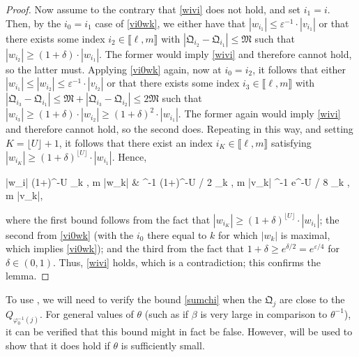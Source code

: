 \documentclass{amsart}
\numberwithin{equation}{section}
\theoremstyle{remark}
\theoremstyle{definition}
\begin{document}
\begin{proof}
		Now assume to the contrary that \eqref{wivi} does not hold, and set $i_1 = i$. Then, by the $i_0 = i_1$ case of \eqref{vi0wk}, we either have that $|w_{i_1}| \le \varepsilon^{-1} \cdot |v_{i_1}|$ or that there exists some index $i_2 \in \llbracket \ell, m \rrbracket$ with $|\mathfrak{Q}_{i_2} - \mathfrak{Q}_{i_1}| \le \mathfrak{M}$ such that $|w_{i_2}| \ge (1+\delta) \cdot |w_{i_1}|$. The former would imply \eqref{wivi} and therefore cannot hold, so the latter must. Applying \eqref{vi0wk} again, now at $i_0 = i_2$, it follows that either $|w_{i_1}| \le |w_{i_2}| \le \varepsilon^{-1} \cdot |v_{i_2}|$ or that there exists some index $i_3 \in \llbracket \ell, m \rrbracket$ with $|\mathfrak{Q}_{i_3} - \mathfrak{Q}_{i_1}| \le \mathfrak{M} + |\mathfrak{Q}_{i_3} - \mathfrak{Q}_{i_2}| \le 2 \mathfrak{M}$ such that $|w_{i_3}| \ge (1+\delta) \cdot |w_{i_2}| \ge (1+\delta)^2 \cdot |w_{i_1}|$. The former again would imply \eqref{wivi} and therefore cannot hold, so the second does. Repeating in this way, and setting $K = \lfloor U \rfloor + 1$, it follows that there exist an index  $i_K \in \llbracket \ell, m \rrbracket$ satisfying $|w_{i_K}| \ge (1 + \delta)^{\lfloor U \rfloor} \cdot |w_{i_1}|$. Hence,
		\begin{flalign*}
			|w_i| \le (1+\delta)^{-\lfloor U \rfloor} \cdot \displaystyle\max_{k \in \llbracket \ell, m \rrbracket} |w_k| & \le \varepsilon^{-1} (1+\delta)^{-U / 2} \cdot \displaystyle\max_{k \in \llbracket \ell, m \rrbracket} |v_k|  \le \varepsilon^{-1} e^{-\varepsilon U / 8} \cdot \displaystyle\max_{k \in \llbracket \ell, m \rrbracket} |v_k|,
		\end{flalign*} 
		
		\noindent where the first bound follows from the fact that $|w_{i_K}| \ge (1+\delta)^{\lfloor U \rfloor} \cdot |w_{i_1}|$; the second from \eqref{vi0wk} (with the $i_0$ there equal to $k$ for which $|w_k|$ is maximal, which implies \eqref{vi0wk}); and the third from the fact that $1+\delta \ge e^{\delta/2} = e^{\varepsilon/4}$ for $\delta \in (0, 1)$. Thus, \eqref{wivi} holds, which is a contradiction; this confirms the lemma.
	\end{proof}
	
	To use , we will need to verify the bound \eqref{sumchi} when the $\mathfrak{Q}_j$ are close to the $Q_{\varphi_0^{-1}(j)}$. For general values of $\theta$ (such as if $\beta$ is very large in comparison to $\theta^{-1}$), it can be verified that this bound might in fact be false. However,  will be used to show that it does hold if $\theta$ is sufficiently small. 
	
\end{document}
